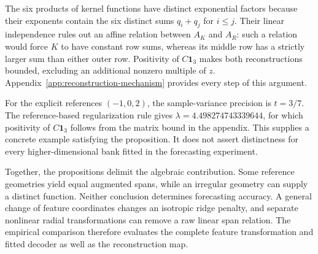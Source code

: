 The six products of kernel functions have distinct exponential factors
because their exponents contain the six distinct sums $q_i+q_j$ for
$i\le j$. Their linear independence rules out an affine relation
between $A_K$ and $A_R$: such a relation would force $K$ to have
constant row sums, whereas its middle row has a strictly larger sum
than either outer row. Positivity of $C\mathbf1_3$ makes both
reconstructions bounded, excluding an additional nonzero multiple of
$z$. Appendix~\ref{app:reconstruction-mechanism} provides every step
of this argument.

For the explicit references $(-1,0,2)$, the sample-variance precision is
$t=3/7$. The reference-based regularization rule gives
$\lambda=4.498274743339644$, for which positivity of $C\mathbf1_3$
follows from the matrix bound in the appendix. This supplies a concrete
example satisfying the proposition. It does not assert distinctness
for every higher-dimensional bank fitted in the forecasting experiment.

Together, the propositions delimit the algebraic contribution. Some
reference geometries yield equal augmented spans, while an irregular
geometry can supply a distinct function. Neither conclusion determines
forecasting accuracy. A general change of feature coordinates changes
an isotropic ridge penalty, and separate nonlinear radial transformations
can remove a raw linear span relation. The empirical comparison
therefore evaluates the complete feature transformation and fitted
decoder as well as the reconstruction map.

